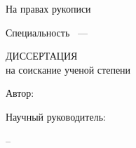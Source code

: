 
%
%
%
%

\thispagestyle{empty}

\begin{center}
\dissorg
\par
\end{center}

\vspace{10mm}
\begin{flushright}
На правах рукописи

\end{flushright}

\vspace{20mm}
\begin{center}
{\bf \large \dissauthor}
\end{center}

\vspace{5mm}
\begin{center}
{\bf \large \disstitle
\par}

\vspace{10mm}
{%
Специальность \specnum~---

\specname
}

\vspace{10mm}
ДИССЕРТАЦИЯ \\ на соискание ученой степени \\

\edudegree
\end{center}

\vspace{5mm}
\begin{flushleft}
	Автор:
\end{flushleft}

\vspace{5mm}
\begin{flushright}
Научный руководитель:

\mentordegree

\mentorname
\end{flushright}





\vfill
\begin{center}
{\disscity -- \dissyear}
\end{center}

